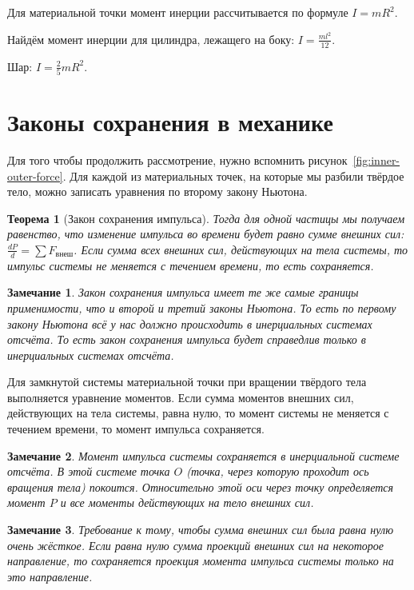 \documentclass[10pt]{extbook}
\newtheorem{theorem}{Теорема}[section]
\newtheorem{corollary}{Замечание}[theorem]
\begin{document}
Для материальной точки момент инерции рассчитывается по формуле \( I = m R^2  \).

Найдём момент инерции для цилиндра, лежащего на боку: \( I = \frac{m l^2
}{12} \).

Шар: \( I = \frac{2}{5} m R^2  \).

\section{Законы сохранения в механике}

Для того чтобы продолжить рассмотрение, нужно вспомнить
рисунок~\ref{fig:inner-outer-force}. Для каждой из материальных точек, на
которые мы разбили твёрдое тело, можно записать уравнения по второму закону
Ньютона.

\begin{theorem}[Закон сохранения импульса]
	Тогда для одной частицы мы получаем равенство, что изменение импульса во времени
	будет равно сумме внешних сил: \( \frac{d P}{d} = \sum F_\text{внеш} \). Если
	сумма всех внешних сил, действующих на тела системы, то импульс системы не
	меняется с течением времени, то есть сохраняется.
\end{theorem}

\begin{corollary}
	Закон сохранения импульса имеет те же самые границы применимости, что и второй
	и третий законы Ньютона. То есть по первому закону Ньютона всё у нас должно
	происходить в инерциальных системах отсчёта. То есть закон сохранения импульса
	будет справедлив только в инерциальных системах отсчёта.
\end{corollary}

Для замкнутой системы материальной точки при вращении твёрдого тела выполняется
уравнение моментов. Если сумма моментов внешних сил, действующих на тела системы,
равна нулю, то момент системы не меняется с течением времени, то момент
импульса сохраняется.

\begin{corollary}
	Момент импульса системы сохраняется в инерциальной системе отсчёта. В этой
	системе точка $O$ (точка, через которую проходит ось вращения тела) покоится.
	Относительно этой оси через точку определяется момент $P$ и все моменты
	действующих на тело внешних сил.
\end{corollary}

\begin{corollary}
	Требование к тому, чтобы сумма внешних сил была равна нулю очень жёсткое.
	Если равна нулю сумма проекций внешних сил на некоторое направление, то
	сохраняется проекция момента импульса системы только на это направление.
\end{corollary}
\end{document}
